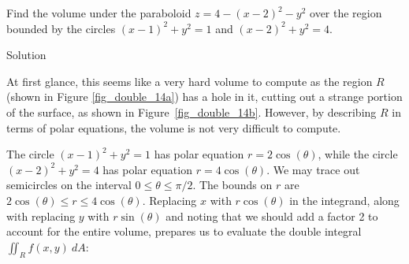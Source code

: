 \begin{example}\label{ex_doublepol2}
Find the volume under the paraboloid $z=4-(x-2)^2-y^2$ over the region bounded by the circles $(x-1)^2+y^2=1$ and $(x-2)^2+y^2=4$.

\pagebreak
{}Solution 

At first glance, this seems like a very hard volume to compute as the region $R$ (shown in Figure \ref{fig_double_14a}) has a hole in it, cutting out a strange portion of the surface, as shown in Figure~\ref{fig_double_14b}. However, by describing $R$ in terms of polar equations, the volume is not very difficult to compute.






The circle $(x-1)^2+y^2=1$ has polar equation $r=2\cos(\theta)$, while the circle $(x-2)^2+y^2=4$ has polar equation $r=4\cos(\theta)$. We may trace out semicircles on the interval $0\leq\theta\leq\pi/2$. The bounds on $r$ are $2\cos(\theta)\leq r\leq 4\cos(\theta).$ Replacing $x$ with $r\cos(\theta)$ in the integrand, along with replacing $y$ with $r\sin(\theta)$ and noting that we should add a factor 2 to account for the entire volume, prepares us to evaluate the double integral $\iint_Rf(x,y)\ dA$:


\end{example}
